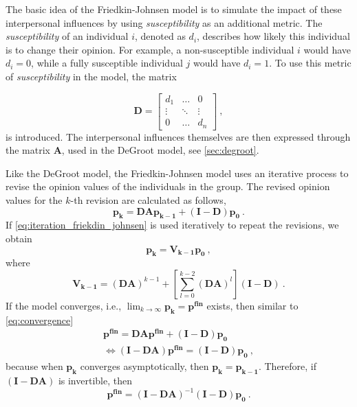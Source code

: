 \documentclass[journal,compsoc,10pt]{IEEEtran}
\renewcommand{\vec}[1]{\bm{#1}}        %
\newcommand{\mat}[1]{\bm{#1}}          %
\newcommand{\eye}{\bm{I}}              %
\begin{document}
The basic idea of the Friedkin-Johnsen model is to simulate the impact of these interpersonal influences by using \textit{susceptibility} as an additional metric. The \textit{susceptibility} of an individual $i$, denoted as $d_i$, describes how likely this individual is to change their opinion. For example, a non-susceptible individual $i$ would have $d_i = 0$, while a fully susceptible individual $j$ would have $d_i= 1$. To use this metric of \textit{susceptibility} in the model, the matrix

\[ \mat D = \begin{bmatrix}
d_1  &\dots & 0\\
\vdots & \ddots & \vdots\\
0 & \dots & d_n
\end{bmatrix}\ , \]
is introduced.
The interpersonal influences themselves are then expressed through the matrix $\mat A$, used in the DeGroot model, see \cref{sec:degroot}.

Like the DeGroot model, the Friedkin-Johnsen model uses an iterative process to revise the opinion values of the individuals in the group. The revised opinion values for the $k$-th revision are calculated as follows,
\begin{equation}\label{eq:iteration_friekdin_johnsen}
    \vec{p_k} = \mat D\mat A\vec{p_{k-1}}+(\eye-\mat D)\vec{p_0} \ .
\end{equation}
If \cref{eq:iteration_friekdin_johnsen} is used iteratively to repeat the revisions, we obtain
\begin{equation}\label{eq:continuous_iteration_friedkin_johnsen}
    \vec{p_k} = \mat{V_{k-1}}\vec{p_0}\ ,
\end{equation}
where
\begin{equation}\label{eq:helpmatrix_v_friekdin_johnsen}
    \mat{V_{k-1}} = (\mat D\mat A)^{k-1}+[\sum_{l=0}^{k-2}(\mat D\mat A)^l](\eye-\mat D)\ .
\end{equation}
If the model converges, i.e., $\lim_{k\rightarrow\infty}\vec{p_k} = \vec{p^{fin}}$ exists, then similar to \cref{eq:convergence}
\begin{multline}
    \vec{p^{fin}} = \mat D \mat A \vec{p^{fin}} + (\eye-\mat D)\vec{p_0} \\\iff (\eye-\mat D \mat A)\vec{p^{fin}} = (\eye-\mat D)\vec{p_0}\ ,
\end{multline}
because when $\vec{p_k}$ converges asymptotically, then $\vec{p_k} = \vec{p_{k-1}}$.
Therefore, if $(\eye-\mat D \mat A)$ is invertible, then
\begin{equation}\label{eq:fj_model_calc_pfin}
    \vec{p^{fin}} = (\eye-\mat D \mat A)^{-1}(\eye-\mat D)\vec{p_0}\ .
\end{equation}
\end{document}
